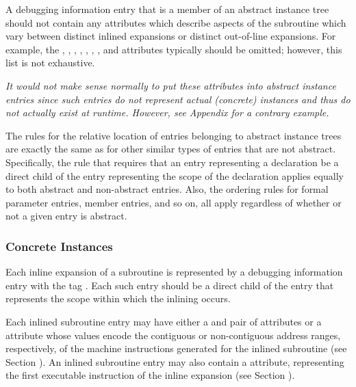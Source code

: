 A debugging information entry that is a member of an abstract
instance tree should not contain any attributes which describe
aspects of the subroutine which vary between distinct inlined
expansions or distinct out-of-line expansions. For example,
the \DWATlowpc,
\DWAThighpc, 
\DWATranges, 
\DWATentrypc, 
\DWATlocation,
\DWATreturnaddr, 
\DWATstartscope, 
and 
\DWATsegment{}
attributes 
typically 
should 
be 
omitted; 
however, 
this 
list
is not exhaustive.

\textit{It would not make sense normally to put these attributes into
abstract instance entries since such entries do not represent
actual (concrete) instances and thus do not actually exist at
run\dash time.  However, 
see Appendix  
for a contrary example.}

The rules for the relative location of entries belonging to
abstract instance trees are exactly the same as for other
similar types of entries that are not abstract. Specifically,
the rule that requires that an entry representing a declaration
be a direct child of the entry representing the scope of the
declaration applies equally to both abstract and non-abstract
entries. Also, the ordering rules for formal parameter entries,
member entries, and so on, all apply regardless of whether
or not a given entry is abstract.

\subsubsection{Concrete Instances}
\label{chap:concreteinstances}

Each inline expansion of a subroutine is represented
by a debugging information entry with the 
tag \DWTAGinlinedsubroutineTARG. 
Each such entry should be a direct
child of the entry that represents the scope within which
the inlining occurs.

Each inlined subroutine entry may have either a 
\DWATlowpc{}
and \DWAThighpc{} pair of attributes
or a \DWATranges{}
attribute whose values encode the contiguous or non-contiguous
address ranges, respectively, of the machine instructions
generated for the inlined subroutine (see 
Section ). 
An\hypertarget{chap:DWATentrypcentryaddressofinlinedsubprogram}{}
inlined subroutine entry may 
also 
contain 
a 
\DWATentrypc{}
attribute, representing the first executable instruction of
the inline expansion (see 
Section ).

